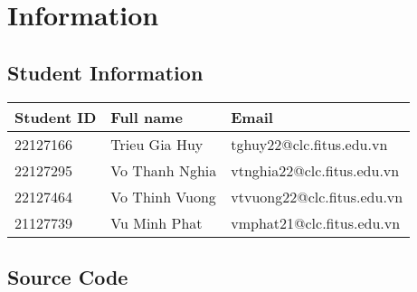\section{Information}
\subsection{Student Information}
\renewcommand{\arraystretch}{2}

\begin{center}
\begin{tabular}{|>{\centering\arraybackslash}m{4cm}|>{\centering\arraybackslash}m{5cm}|>{\centering\arraybackslash}m{7cm}|}
  \hline
  \textbf{\Large Student ID} & \textbf{\Large Full name} & \textbf{\Large Email} \\
  \hline
  \Large 22127166 & \Large Trieu Gia Huy & \Large tghuy22@clc.fitus.edu.vn
  \\
  \hline
  \Large 22127295 & \Large Vo Thanh Nghia & \Large vtnghia22@clc.fitus.edu.vn \\
  \hline
  \Large 22127464 & \Large Vo Thinh Vuong & \Large vtvuong22@clc.fitus.edu.vn \\
  \hline  
  \Large 21127739 & \Large Vu Minh Phat & \Large vmphat21@clc.fitus.edu.vn \\
  \hline    
\end{tabular}
\end{center}

\subsection{Source Code}


